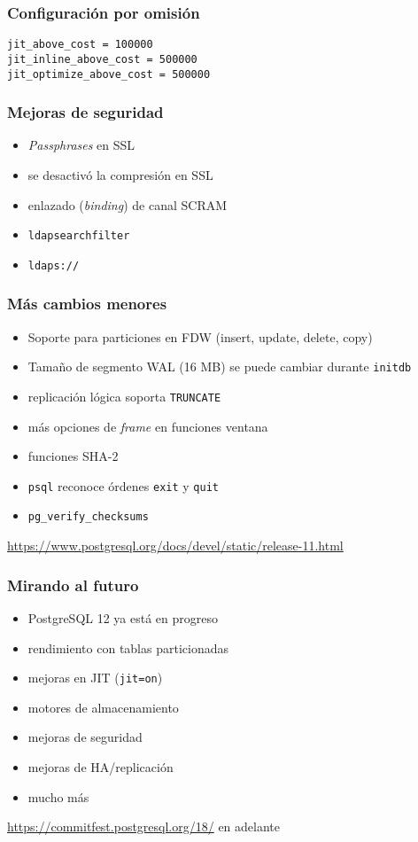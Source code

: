 \begin{frame}[fragile]
  \frametitle{Configuración por omisión}

\begin{lstlisting}
jit_above_cost = 100000
jit_inline_above_cost = 500000
jit_optimize_above_cost = 500000
\end{lstlisting}
\end{frame}

\begin{frame}
  \frametitle{Mejoras de seguridad}

\begin{itemize}
  \item \emph{Passphrases} en SSL
  \item se desactivó la compresión en SSL
  \item enlazado (\emph{binding}) de canal SCRAM
  \item \texttt{ldapsearchfilter}
  \item \texttt{ldaps://}
\end{itemize}

\end{frame}

\begin{frame}
  \frametitle{Más cambios menores}

  \begin{itemize}
    \item Soporte para particiones en FDW (insert, update, delete, copy)
    \item Tamaño de segmento WAL (16 MB) se puede cambiar durante \texttt{initdb}
    \item replicación lógica soporta \texttt{TRUNCATE}
    \item más opciones de \emph{frame} en funciones ventana
    \item funciones SHA-2
    \item \texttt{psql} reconoce órdenes \texttt{exit} y \texttt{quit}
    \item \texttt{pg\_verify\_checksums}
  \end{itemize}

  \url{https://www.postgresql.org/docs/devel/static/release-11.html}

\end{frame}

\begin{frame}
    \frametitle{Mirando al futuro}

    \begin{itemize}
      \item PostgreSQL 12 ya está en progreso
      \item rendimiento con tablas particionadas
      \item mejoras en JIT (\texttt{jit=on})
      \item motores de almacenamiento
      \item mejoras de seguridad
      \item mejoras de HA/replicación
      \item mucho más
    \end{itemize}

    \url{https://commitfest.postgresql.org/18/} en adelante
\end{frame}

